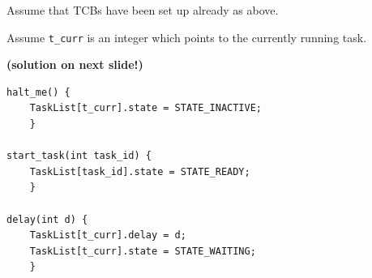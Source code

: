 \documentclass{article}	%
\begin{document}
 Assume that TCBs have been set up already as above.
 
 Assume {\tt t\_curr} is an integer which points to the currently running task.
 
\vspace{0.5in}
{\bf (solution on next slide!) }

\begin{verbatim}
halt_me() {
    TaskList[t_curr].state = STATE_INACTIVE;
    }

start_task(int task_id) {
    TaskList[task_id].state = STATE_READY;
    }

delay(int d) {
    TaskList[t_curr].delay = d;
    TaskList[t_curr].state = STATE_WAITING;
    }
\end{verbatim}


 
\end{document}
